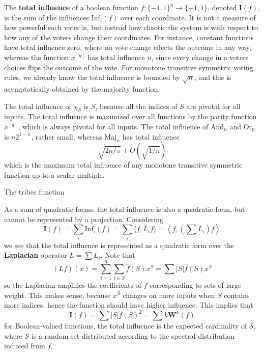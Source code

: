 The {\bf total influence} of a boolean function $f: \{ -1, 1 \}^n \to \{ -1, 1 \}$, denoted $\mathbf{I}(f)$, is the sum of the influences $\text{Inf}_i(f)$ over each coordinate. It is not a measure of how powerful each voter is, but instead how chaotic the system is with respect to how any of the voters change their coordinates. For instance, constant functions have total influence zero, where no vote change effects the outcome in any way, whereas the function $x^{[n]}$ has total influence $n$, since every change in a voters choices flips the outcome of the vote. For monotone transitive symmetric voting rules, we already know the total influence is bounded by $\sqrt{n}$, and this is asymptotically obtained by the majority function.

\begin{example}
    The total influence of $\chi_S$ is $S$, because all the indices of $S$ are pivotal for all inputs. The total influence is maximized over all functions by the parity function $x^{[n]}$, which is always pivotal for all inputs. The total influence of $\text{And}_n$ and $\text{Or}_n$ is $n2^{1-n}$, rather small, whereas $\text{Maj}_n$ has total influence
    \[ \sqrt{2n/\pi} + O \left( \sqrt{1/n} \right) \]
    which is the maximum total influence of any monotone transitive symmetric function up to a scalar multiple.
\end{example}

\begin{example}
    The tribes function
\end{example}

As a sum of quadratic forms, the total influence is also a quadratic form, but cannot be represented by a projection. Considering
%
\[ \mathbf{I}(f) = \sum_i \text{Inf}_i(f) = \sum_i \langle f, L_i f \rangle = \left\langle f, \left( \sum L_i \right) f \right\rangle \]
%
we see that the total influence is represented as a quadratic form over the {\bf Laplacian} operator $L = \sum L_i$. Note that
%
\[ (Lf)(x) = \sum_{i = 1}^n \sum_{i \in S} \widehat{f}(S) x^S = \sum |S| \widehat{f}(S) x^S \]
%
so the Laplacian amplifies the coefficients of $f$ corresponding to sets of large weight. This makes sense, because $x^S$ changes on more inputs when $S$ contains more indices, hence the function should have higher influence. This implies that
%
\[ \mathbf{I}(f) = \sum |S| \widehat{f}(S)^2 = \sum k \mathbf{W}^k(f) \]
%
for Boolean-valued functions, the total influence is the expected cardinality of $\mathcal{S}$, where $\mathcal{S}$ is a random set distributed according to the spectral distribution induced from $f$.

